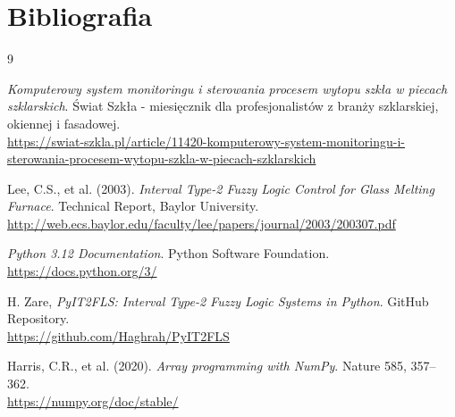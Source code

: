 \documentclass[12pt,a4paper]{article}
\begin{document}
\section{Bibliografia}

\begin{thebibliography}{9}

\textit{Komputerowy system monitoringu i sterowania procesem wytopu szkła w piecach szklarskich}.
Świat Szkła - miesięcznik dla profesjonalistów z branży szklarskiej, okiennej i fasadowej.\\
\url{https://swiat-szkla.pl/article/11420-komputerowy-system-monitoringu-i-sterowania-procesem-wytopu-szkla-w-piecach-szklarskich}

Lee, C.S., et al. (2003).
\textit{Interval Type-2 Fuzzy Logic Control for Glass Melting Furnace}.
Technical Report, Baylor University.\\
\url{http://web.ecs.baylor.edu/faculty/lee/papers/journal/2003/200307.pdf}

\textit{Python 3.12 Documentation}.
Python Software Foundation.\\
\url{https://docs.python.org/3/}

H. Zare, \textit{PyIT2FLS: Interval Type-2 Fuzzy Logic Systems in Python}.
GitHub Repository.\\
\url{https://github.com/Haghrah/PyIT2FLS}

Harris, C.R., et al. (2020).
\textit{Array programming with NumPy}.
Nature 585, 357–362.\\
\url{https://numpy.org/doc/stable/}

\end{thebibliography}
\end{document}
